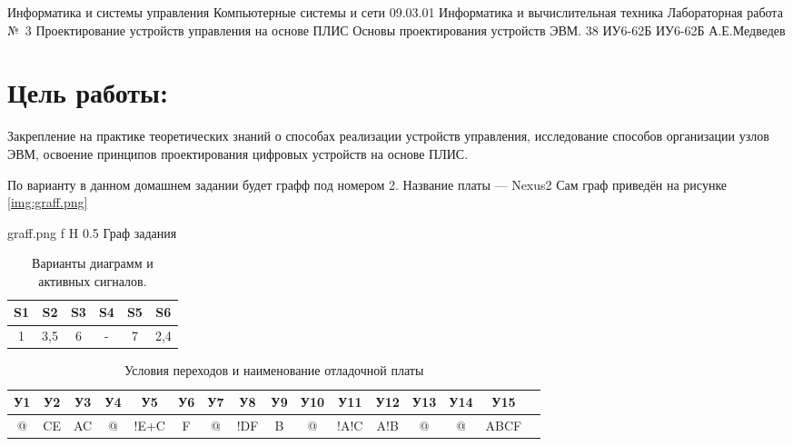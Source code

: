 \documentclass{bmstu}
\begin{document}
\makereporttitle
    {Информатика и системы управления} %
    {Компьютерные системы и сети} %
    {09.03.01 Информатика и вычислительная техника} %
    {Лабораторная работа №~3} %
    {Проектирование устройств управления на основе ПЛИС} %
    {Основы проектирования устройств ЭВМ.} %
    {38} %
    {ИУ6-62Б} %
    {
    	{ИУ6-62Б}
    	{А.Е.Медведев} %
    	{} %
    } 
    
\section*{Цель работы:}
Закрепление на практике теоретических знаний о
способах реализации устройств управления, исследование способов
организации узлов ЭВМ, освоение принципов проектирования цифровых
устройств на основе ПЛИС.

По варианту в данном домашнем задании будет графф под номером 2. Название платы --- Nexus2
Сам граф приведён на рисунке \ref{img:graff.png}

	{graff.png}
	{f}
	{H}
	{0.5\textwidth}
	{Граф задания}


\begin{table}[ht]
        \begin{center}
        \caption{Варианты диаграмм и активных сигналов.}
        \begin{tabular}{|c|c|c|c|c|c|}
                \hline
                S1 & S2 & S3 & S4 & S5 & S6\\
                \hline
                1 & 3,5 & 6 & - & 7 & 2,4\\
                \hline
        \end{tabular}
        \end{center}
\end{table}
                

\begin{table}[ht]
        \begin{center}
        \caption{Условия переходов и наименование отладочной платы}
        \begin{tabular}{|c|c|c|c|c|c|c|c|c|c|c|c|c|c|c|c|}
                \hline 
                У1 & У2 & У3 & У4 & У5 & У6 & У7 & У8 & У9 & У10 & У11 & У12 & У13 & У14 & У15 \\
                \hline
                @ & CE & AC & @ & !E+C & F & @ & !DF & B & @ & !A!C & A!B & @ & @ & ABCF\\
                \hline
        \end{tabular}
        \end{center}
\end{table}
\end{document}
